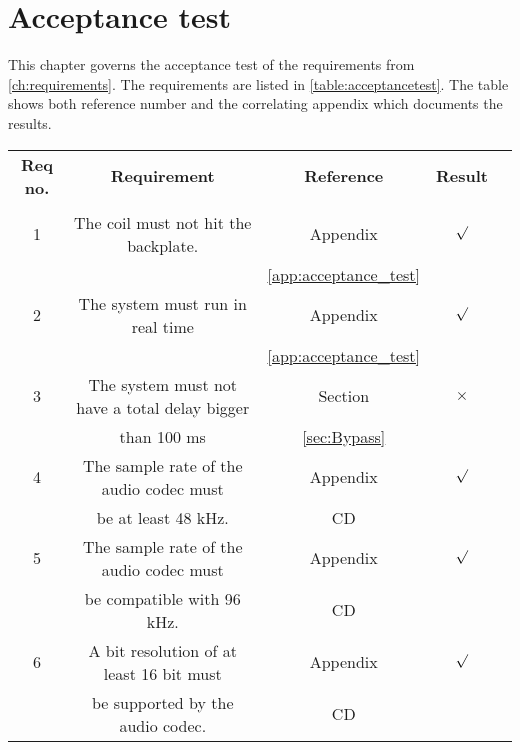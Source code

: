 \chapter{Acceptance test}

This chapter governs the acceptance test of the requirements from \autoref{ch:requirements}. The requirements are listed in \autoref{table:acceptancetest}. The table shows both reference number and the correlating appendix which documents the results.  

\renewcommand{\arraystretch}{0.95}
\begin{table}[H]
\centering
\begin{tabular}{|c|c|c|c|c|} \hline
\rowcolor{lightgray} \bfseries Req no. 	& \bfseries Requirement 						&  \bfseries Reference				&\bfseries Result 	\\ 
\rowcolor{lightgray}					&												&  									&		 			\\ \hline

1			& The coil must not hit the backplate. 			& Appendix 								&	$\surd$ 		\\ 
 			&												& \ref{app:acceptance_test}				&	 				\\ \hline
%
2			& The system must run in real time	 			& Appendix								& 	$\surd$			\\ 
			& 												& \ref{app:acceptance_test}				&					\\ \hline
%
3			& The system must not have a total delay bigger & Section								&  $\times$			\\ 
			& than 100 ms			 						& \ref{sec:Bypass}						&					\\ \hline
%
4			& The sample rate of the audio codec must   	& Appendix								& 	$\surd$			\\ 
			& be at least 48 kHz.							&	CD									&					\\ \hline

5			& The sample rate of the audio codec must   	& Appendix								& 	$\surd$			\\ 
			& be compatible with 96 kHz.					&	CD									&					\\ \hline
6			&  A bit resolution of at least 16 bit must 	& Appendix								&	$\surd$			\\ 
			&  be supported by the audio codec. 	 	 	&	CD					 				&					\\ \hline


\end{tabular}
\end{table}
